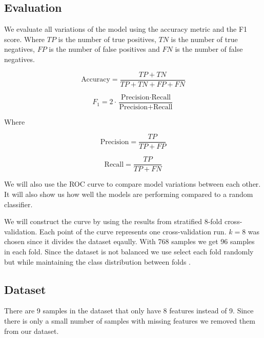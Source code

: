 


\subsection{Evaluation}

We evaluate all variations of the model using the accuracy metric and the F1 score. Where $TP$ is the number of true positives, $TN$ is the number of true negatives, $FP$ is the number of false positives and $FN$ is the number of false negatives. \cite{Marsland2015}

\begin{equation}
  \text{Accuracy} = \frac{TP + TN}{TP + TN + FP + FN}
  \label{eq:accuracy}
\end{equation}

\begin{equation}
  F_1 = 2 \cdot \frac{\text{Precision} \cdot \text{Recall}}{\text{Precision} + \text{Recall}}
  \label{eq:f1}
\end{equation} 

Where 

\begin{equation}
  \text{Precision} = \frac{TP}{TP + FP}
  \label{eq:precision}
\end{equation}

\begin{equation}
  \text{Recall} = \frac{TP}{TP + FN}
  \label{eq:recall}
\end{equation}

We will also use the ROC curve to compare model variations between each other. It will also show us how well the models are performing compared to a random classifier. 

We will construct the curve by using the results from stratified 8-fold cross-validation. Each point of the curve represents one cross-validation run. $k=8$ was chosen since it divides the dataset eqaully. With 768 samples we get 96 samples in each fold. Since the dataset is not balanced we use select each fold randomly but while maintaining the class distribution between folds \cite{Brownlee2023, Krasnoshchek2024, Brownlee2020_imbalanced}.

\subsection{Dataset}

There are 9 samples in the dataset that only have 8 features instead of 9. Since there is only a small number of samples with missing features we removed them from our dataset.





